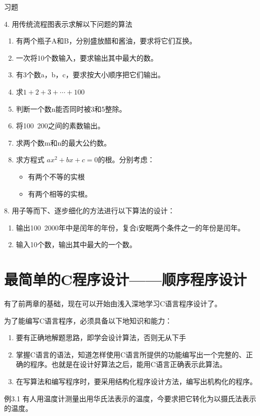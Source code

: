 \begin{lslisting}
\begin{enumerate}
习题

4. 用传统流程图表示求解以下问题的算法
\begin{enumerate}
	\item 有两个瓶子A和B，分别盛放醋和酱油，要求将它们互换。
	\item 一次将10个数输入，要求输出其中最大的数。
	\item 有3个数a，b，c，要求按大小顺序把它们输出。
	\item 求$1 + 2 + 3 + \cdots + 100$
	\item 判断一个数n能否同时被3和5整除。
	\item 将100~200之间的素数输出。
	\item 求两个数m和n的最大公约数。
	\item 求方程式 $ax^2 + bx + c = 0$的根。分别考虑：
		\begin{itemize}
			\item 有两个不等的实根
			\item 有两个相等的实根。
		\end{itemize}
\end{enumerate}
8. 用子等而下、逐步细化的方法进行以下算法的设计：
\begin{enumerate}
	\item 输出100~2000年中是闰年的年份，复合i安眠两个条件之一的年份是闰年。
	\item 输入10个数，输出其中最大的一个数。
\end{enumerate}

\chapter{最简单的C程序设计——顺序程序设计}

有了前两章的基础，现在可以开始由浅入深地学习C语言程序设计了。

为了能编写C语言程序，必须具备以下地知识和能力：
\begin{enumerate}
	\item 要有正确地解题思路，即学会设计算法，否则无从下手
	\item 掌握C语言的语法，知道怎样使用C语言所提供的功能编写出一个完整的、正确的程序。也就是在设计好算法之后，能用C语言正确表示此算法。
	\item 在写算法和编写程序时，要采用结构化程序设计方法，编写出机构化的程序。
\end{enumerate}
例3.1 有人用温度计测量出用华氏法表示的温度，今要求把它转化为以摄氏法表示的温度。


\end{enumerate}
\end{lslisting}
